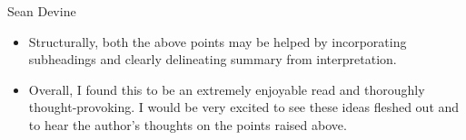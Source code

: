 \documentclass[twocolumn, serif, authordate, review]{jote-article}
\begin{document}
\begin{paracol}{2}
\begin{reviewend}{Sean Devine}
\begin{itemize}
    \item Structurally, both the above points may be helped by incorporating subheadings and clearly delineating summary from interpretation. 
    \item Overall, I found this to be an extremely enjoyable read and thoroughly thought-provoking. I would be very excited to see these ideas fleshed out and to hear the author’s thoughts on the points raised above. 
    \end{itemize}
\end{reviewend}
\end{paracol}









\printbibliography
\end{document}
